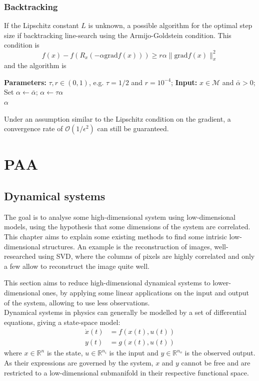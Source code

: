 \documentclass[12pt, openany]{report}
\newcommand{\R}{\mathbb{R}}
\newcommand{\M}{\mathcal{M}}
\renewcommand{\O}{\mathcal{O}}
\theoremstyle{definition}
\begin{document}
\subsection{Backtracking}
If the Lipschitz constant $L$ is unknown, a possible algorithm for the optimal step size if backtracking line-search using the Armijo-Goldstein condition. This condition is 
\begin{equation}
	f(x) - f(R_x(-\alpha \text{grad}f(x))) \ge r\alpha \|\text{grad}f(x)\|_x^2
\end{equation}
and the algorithm is 
\begin{algorithm}[H]
	\caption{Backtracking line-search}
	\begin{algorithmic}[1]
		\State \textbf{Parameters:} $\tau,r\in (0,1)$, e.g. $\tau=1/2$ and $r=10^{-4}$;
		\State \textbf{Input:} $x\in \M$ and $\bar \alpha >0$;
		\State Set $\alpha \leftarrow \bar \alpha$;
		\State $\alpha \leftarrow \tau \alpha$
		\EndWhile \\
		\Return $\alpha$
	\end{algorithmic}
\end{algorithm}
Under an assumption similar to the Lipschitz condition on the gradient, a convergence rate of $\O(1/\epsilon^2)$ can still be guaranteed. \\

\chapter{PAA}
\section{Dynamical systems}
The goal is to analyse some high-dimensional system using low-dimensional models, using the hypothesis that some dimensions of the system are correlated. This chapter aims to explain some existing methods to find some intrisic low-dimensional structures. An example is the reconstruction of images, well-researched using SVD, where the columns of pixels are highly correlated and only a few allow to reconstruct the image quite well. 

This section aims to reduce high-dimensional dynamical systems to lower-dimensional ones, by applying some linear applications on the input and output of the system, allowing to use less observations. \\

Dynamical systems in physics can generally be modelled by a set of differential equations, giving a state-space model:
\begin{equation}
	\begin{aligned}
		\dot x(t) &= f(x(t),u(t))\\
		y(t) &= g(x(t),u(t))
	\end{aligned}
\end{equation}
where $x\in \R^n$ is the state, $u\in \R^{n_i}$ is the input and $y\in \R^{n_o}$ is the observed output. As their expressions are governed by the system, $x$ and $y$ cannot be free and are restricted to a low-dimensional submanifold in their respective functional space. 
\end{document}
